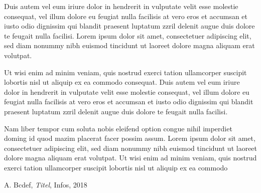 \documentclass{article}
\begin{document}
Duis autem vel eum iriure dolor in hendrerit in vulputate velit esse molestie consequat, vel illum dolore eu feugiat nulla facilisis at vero eros et accumsan et iusto odio dignissim qui blandit praesent luptatum zzril delenit augue duis dolore te feugait nulla facilisi. Lorem ipsum dolor sit amet, consectetuer adipiscing elit, sed diam nonummy nibh euismod tincidunt ut laoreet dolore magna aliquam erat volutpat.   

Ut wisi enim ad minim veniam, quis nostrud exerci tation ullamcorper suscipit lobortis nisl ut aliquip ex ea commodo consequat. Duis autem vel eum iriure dolor in hendrerit in vulputate velit esse molestie consequat, vel illum dolore eu feugiat nulla facilisis at vero eros et accumsan et iusto odio dignissim qui blandit praesent luptatum zzril delenit augue duis dolore te feugait nulla facilisi.   

Nam liber tempor cum soluta nobis eleifend option congue nihil imperdiet doming id quod mazim placerat facer possim assum. Lorem ipsum dolor sit amet, consectetuer adipiscing elit, sed diam nonummy nibh euismod tincidunt ut laoreet dolore magna aliquam erat volutpat. Ut wisi enim ad minim veniam, quis nostrud exerci tation ullamcorper suscipit lobortis nisl ut aliquip ex ea commodo







\newpage



\begin{thebibliography}{999}

 A. Bcdef, \emph{Titel}, Infos, 2018 \\[-2.8mm]



\end{thebibliography}
\end{document}
